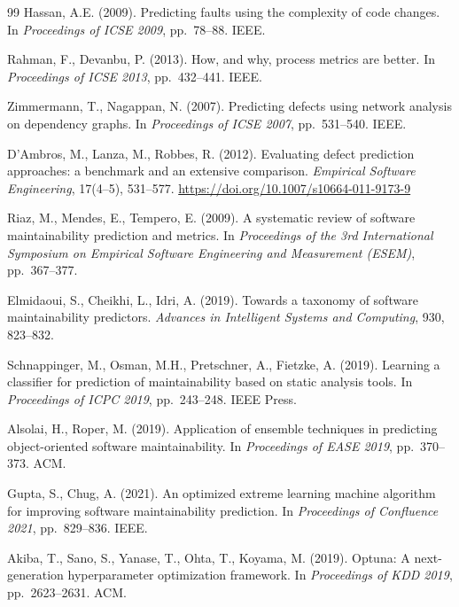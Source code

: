 \documentclass[11pt,a4paper]{article}
\begin{document}
\begin{thebibliography}{99}
Hassan, A.E. (2009).
\newblock Predicting faults using the complexity of code changes.
\newblock In \emph{Proceedings of ICSE 2009}, pp.\ 78--88. IEEE.

Rahman, F., Devanbu, P. (2013).
\newblock How, and why, process metrics are better.
\newblock In \emph{Proceedings of ICSE 2013}, pp.\ 432--441. IEEE.

Zimmermann, T., Nagappan, N. (2007).
\newblock Predicting defects using network analysis on dependency graphs.
\newblock In \emph{Proceedings of ICSE 2007}, pp.\ 531--540. IEEE.

D'Ambros, M., Lanza, M., Robbes, R. (2012).
\newblock Evaluating defect prediction approaches: a benchmark and an
  extensive comparison.
\newblock \emph{Empirical Software Engineering}, 17(4--5), 531--577.
\newblock \url{https://doi.org/10.1007/s10664-011-9173-9}

Riaz, M., Mendes, E., Tempero, E. (2009).
\newblock A systematic review of software maintainability prediction and
  metrics.
\newblock In \emph{Proceedings of the 3rd International Symposium on Empirical
  Software Engineering and Measurement (ESEM)}, pp.\ 367--377.

Elmidaoui, S., Cheikhi, L., Idri, A. (2019).
\newblock Towards a taxonomy of software maintainability predictors.
\newblock \emph{Advances in Intelligent Systems and Computing}, 930, 823--832.

Schnappinger, M., Osman, M.H., Pretschner, A., Fietzke, A. (2019).
\newblock Learning a classifier for prediction of maintainability based on
  static analysis tools.
\newblock In \emph{Proceedings of ICPC 2019}, pp.\ 243--248. IEEE Press.

Alsolai, H., Roper, M. (2019).
\newblock Application of ensemble techniques in predicting object-oriented
  software maintainability.
\newblock In \emph{Proceedings of EASE 2019}, pp.\ 370--373. ACM.

Gupta, S., Chug, A. (2021).
\newblock An optimized extreme learning machine algorithm for improving
  software maintainability prediction.
\newblock In \emph{Proceedings of Confluence 2021}, pp.\ 829--836. IEEE.

Akiba, T., Sano, S., Yanase, T., Ohta, T., Koyama, M. (2019).
\newblock Optuna: A next-generation hyperparameter optimization framework.
\newblock In \emph{Proceedings of KDD 2019}, pp.\ 2623--2631. ACM.


\end{thebibliography}
\end{document}
